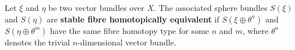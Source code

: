 Let $\xi$ and $\eta$ be two vector bundles over $X$. The associated sphere bundles $S(\xi)$ and $S(\eta)$ are \textbf{stable fibre homotopically equivalent} if $S(\xi \oplus \theta^n)$ and $S(\eta \oplus \theta^m)$ have the same fibre homotopy type for some $n$ and $m$, where $\theta^n$ denotes the trivial $n$-dimensional vector bundle.
